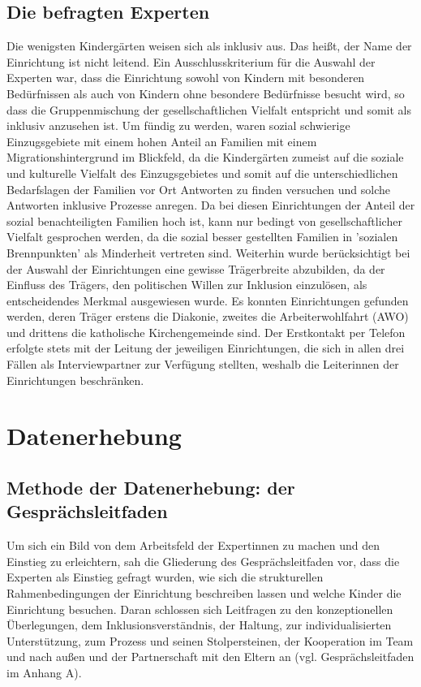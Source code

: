 \subsection{Die befragten Experten}
Die wenigsten Kindergärten weisen sich als inklusiv aus. Das heißt, der Name der Einrichtung ist nicht leitend. Ein Ausschlusskriterium für die Auswahl der Experten war, dass die Einrichtung sowohl von Kindern mit besonderen Bedürfnissen als auch von Kindern ohne besondere Bedürfnisse besucht wird, so dass die Gruppenmischung der gesellschaftlichen Vielfalt entspricht und somit als inklusiv anzusehen ist. Um fündig zu werden, waren sozial schwierige Einzugsgebiete mit einem hohen Anteil an Familien mit einem Migrationshintergrund im Blickfeld, da die Kindergärten zumeist auf die soziale und kulturelle Vielfalt des Einzugsgebietes und somit auf die unterschiedlichen Bedarfslagen der Familien vor Ort Antworten zu finden versuchen und solche Antworten inklusive Prozesse anregen. Da bei diesen Einrichtungen der Anteil der sozial benachteiligten Familien hoch ist, kann nur bedingt von gesellschaftlicher Vielfalt gesprochen werden, da die sozial besser gestellten Familien in ’sozialen Brennpunkten’ als Minderheit vertreten sind.    
Weiterhin wurde berücksichtigt bei der Auswahl der Einrichtungen eine gewisse Trägerbreite abzubilden, da der Einfluss des Trägers, den politischen Willen zur Inklusion einzulösen, als entscheidendes Merkmal ausgewiesen wurde. Es konnten Einrichtungen gefunden werden, deren Träger erstens die Diakonie, zweites die Arbeiterwohlfahrt (AWO) und drittens die katholische Kirchengemeinde sind. Der Erstkontakt per Telefon erfolgte stets mit der Leitung der jeweiligen Einrichtungen, die sich in allen drei Fällen als Interviewpartner zur Verfügung stellten, weshalb die Leiterinnen der Einrichtungen beschränken.

\section{Datenerhebung}
\subsection{Methode der Datenerhebung: der Gesprächsleitfaden}
Um sich ein Bild von dem Arbeitsfeld der Expertinnen zu machen und den Einstieg zu erleichtern, sah die Gliederung des Gesprächsleitfaden vor, dass die Experten als Einstieg gefragt wurden, wie sich die strukturellen Rahmenbedingungen der Einrichtung beschreiben lassen und welche Kinder die Einrichtung besuchen. Daran schlossen sich  Leitfragen zu den konzeptionellen Überlegungen, dem Inklusionsverständnis, der Haltung, zur individualisierten Unterstützung, zum Prozess und seinen Stolpersteinen, der Kooperation im Team und nach außen und der Partnerschaft mit den Eltern an (vgl. Gesprächsleitfaden im Anhang A).

